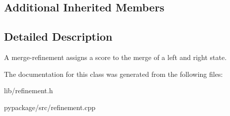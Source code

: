 \subsection*{Additional Inherited Members}


\subsection{Detailed Description}
A merge-\/refinement assigns a score to the merge of a left and right state. 

The documentation for this class was generated from the following files\+:\begin{DoxyCompactItemize}
\item 
lib/refinement.\+h\item 
pypackage/src/refinement.\+cpp\end{DoxyCompactItemize}
